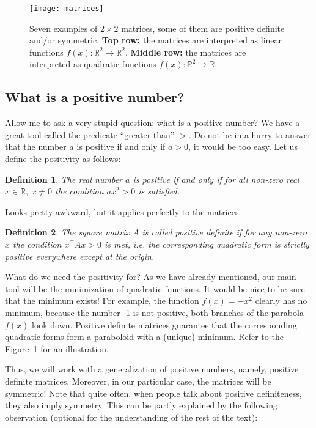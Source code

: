 \documentclass[notitlepage,oneside]{book}
\newtheorem{definition}{Definition}
\begin{document}
\begin{figure}[ht]
	\centering
	\texttt{[image: matrices]}
	\caption{Seven examples of $2\times 2$ matrices, some of them are positive definite and/or symmetric. 
    \textbf{Top row:} the matrices are interpreted as linear functions $f(x):\mathbb R^2 \rightarrow \mathbb R^2$. \textbf{Middle row:} the matrices are interpreted as quadratic functions
 $f(x):\mathbb R^2 \rightarrow \mathbb R$.}
	\label{fig:matrices}
\end{figure}


\subsection{What is a positive number?}
Allow me to ask a very stupid question: what is a positive number?
We have a great tool called the predicate ``greater than'' $>$.
Do not be in a hurry to answer that the number $a$ is positive if and only if $a>0$, it would be too easy. Let us define the positivity as follows:

\begin{definition}
The real number $a$ is positive if and only if for all non-zero real $x\in\mathbb R,\ x\neq 0$ the condition $ax^2>0$ is satisfied.
\end{definition}

Looks pretty awkward, but it applies perfectly to the matrices:

\begin{definition}
The square matrix $A$ is called positive definite if for any non-zero $x$
the condition $x^\top A x > 0$ is met, i.e. the corresponding quadratic form is strictly positive everywhere except at the origin.
\end{definition}

What do we need the positivity for?
As we have already mentioned, our main tool will be the minimization of quadratic functions. 
It would be nice to be sure that the minimum exists!
For example, the function $f(x) = - x^2$ clearly has no minimum, because the number -1 is not positive, 
both branches of the parabola $f(x)$ look down.
Positive definite matrices guarantee that the corresponding quadratic forms form a paraboloid with a (unique) minimum.
Refer to the Figure~\ref{fig:matrices} for an illustration.

Thus, we will work with a generalization of positive numbers, namely, positive definite matrices. 
Moreover, in our particular case, the matrices will be symmetric!
Note that quite often, when people talk about positive definiteness, they also imply symmetry.
This can be partly explained by the following observation (optional for the understanding of the rest of the text):
\end{document}
